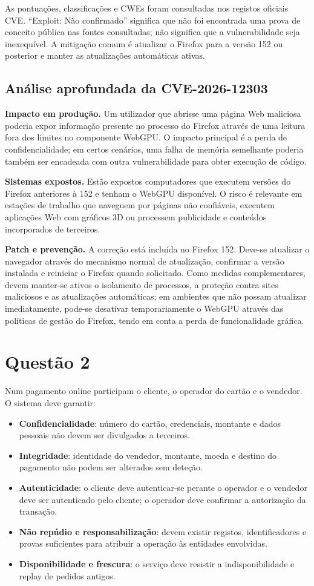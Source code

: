 \documentclass[11pt,a4paper]{article}
\begin{document}
As pontuações, classificações e CWEs foram consultadas nos registos oficiais CVE. ``Exploit: Não confirmado'' significa que não foi encontrada uma prova de conceito pública nas fontes consultadas; não significa que a vulnerabilidade seja inexequível. A mitigação comum é atualizar o Firefox para a versão 152 ou posterior e manter as atualizações automáticas ativas.

\subsection*{Análise aprofundada da CVE-2026-12303}

\textbf{Impacto em produção.} Um utilizador que abrisse uma página Web maliciosa poderia expor informação presente no processo do Firefox através de uma leitura fora dos limites no componente WebGPU. O impacto principal é a perda de confidencialidade; em certos cenários, uma falha de memória semelhante poderia também ser encadeada com outra vulnerabilidade para obter execução de código.

\textbf{Sistemas expostos.} Estão expostos computadores que executem versões do Firefox anteriores à 152 e tenham o WebGPU disponível. O risco é relevante em estações de trabalho que naveguem por páginas não confiáveis, executem aplicações Web com gráficos 3D ou processem publicidade e conteúdos incorporados de terceiros.

\textbf{Patch e prevenção.} A correção está incluída no Firefox 152. Deve-se atualizar o navegador através do mecanismo normal de atualização, confirmar a versão instalada e reiniciar o Firefox quando solicitado. Como medidas complementares, devem manter-se ativos o isolamento de processos, a proteção contra sites maliciosos e as atualizações automáticas; em ambientes que não possam atualizar imediatamente, pode-se desativar temporariamente o WebGPU através das políticas de gestão do Firefox, tendo em conta a perda de funcionalidade gráfica.
\section*{Questão 2}

Num pagamento online participam o cliente, o operador do cartão e o vendedor. O sistema deve garantir:
\begin{itemize}
\item \textbf{Confidencialidade}: número do cartão, credenciais, montante e dados pessoais não devem ser divulgados a terceiros.
\item \textbf{Integridade}: identidade do vendedor, montante, moeda e destino do pagamento não podem ser alterados sem deteção.
\item \textbf{Autenticidade}: o cliente deve autenticar-se perante o operador e o vendedor deve ser autenticado pelo cliente; o operador deve confirmar a autorização da transação.
\item \textbf{Não repúdio e responsabilização}: devem existir registos, identificadores e provas suficientes para atribuir a operação às entidades envolvidas.
\item \textbf{Disponibilidade e frescura}: o serviço deve resistir a indisponibilidade e replay de pedidos antigos.
\end{itemize}
\end{document}
